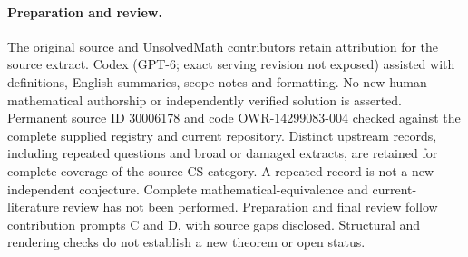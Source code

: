 \documentclass[11pt]{article}
\begin{document}
\paragraph{Preparation and review.}
The original source and UnsolvedMath contributors retain attribution for the source extract. Codex (GPT-6; exact serving revision not exposed) assisted with definitions, English summaries, scope notes and formatting. No new human mathematical authorship or independently verified solution is asserted. Permanent source ID 30006178 and code OWR-14299083-004 checked against the complete supplied registry and current repository. Distinct upstream records, including repeated questions and broad or damaged extracts, are retained for complete coverage of the source CS category. A repeated record is not a new independent conjecture. Complete mathematical-equivalence and current-literature review has not been performed. Preparation and final review follow contribution prompts C and D, with source gaps disclosed. Structural and rendering checks do not establish a new theorem or open status.
\label{end:30006178}
\end{document}
